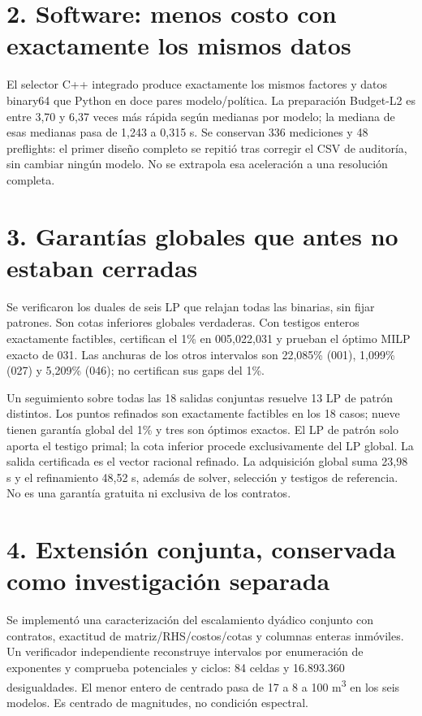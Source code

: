 \documentclass[11pt]{article}
\begin{document}
\section*{2. Software: menos costo con exactamente los mismos datos}
El selector C++ integrado produce exactamente los mismos factores y datos
binary64 que Python en doce pares modelo/política. La preparación Budget-L2
es entre 3,70 y 6,37 veces más rápida según medianas por modelo; la mediana de
esas medianas pasa de 1,243 a 0,315 s. Se conservan 336 mediciones y 48 preflights:
el primer diseño completo se repitió tras corregir el CSV de auditoría, sin
cambiar ningún modelo. No se extrapola esa aceleración a una resolución completa.

\section*{3. Garantías globales que antes no estaban cerradas}
Se verificaron los duales de seis LP que relajan todas las binarias, sin fijar
patrones. Son cotas inferiores globales verdaderas. Con testigos enteros
exactamente factibles, certifican el 1\% en 005,022,031 y prueban el óptimo
MILP exacto de 031. Las anchuras de los otros intervalos son 22,085\% (001),
1,099\% (027) y 5,209\% (046); no certifican sus gaps del 1\%.

Un seguimiento sobre todas las 18 salidas conjuntas resuelve 13 LP de patrón
distintos. Los puntos refinados son exactamente factibles en los 18 casos;
nueve tienen garantía global del 1\% y tres son óptimos exactos. El LP de patrón
solo aporta el testigo primal; la cota inferior procede exclusivamente del LP
global. La salida certificada es el vector racional refinado. La adquisición
global suma 23,98 s y el refinamiento 48,52 s, además de solver, selección y
testigos de referencia. No es una garantía gratuita ni exclusiva de los contratos.

\section*{4. Extensión conjunta, conservada como investigación separada}
Se implementó una caracterización del escalamiento dyádico conjunto con
contratos, exactitud de matriz/RHS/costos/cotas y columnas enteras inmóviles.
Un verificador independiente reconstruye intervalos por enumeración de
exponentes y comprueba potenciales y ciclos: 84 celdas y 16.893.360 desigualdades.
El menor entero de centrado pasa de 17 a 8 a 100 m\textsuperscript{3} en los seis
modelos. Es centrado de magnitudes, no condición espectral.
\end{document}
